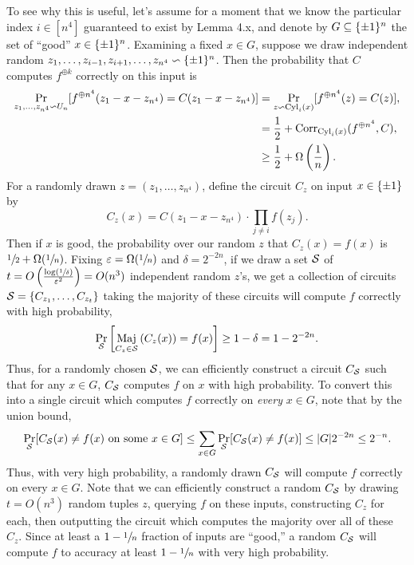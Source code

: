 \documentclass[11pt]{article}
\begin{document}
To see why this is useful, let's assume for a moment that we know the particular index $i \in [n^4]$ guaranteed to exist by Lemma 4.x, and denote by $G \subseteq \{\pm 1\}^n$ the set of ``good'' $x \in \{\pm 1\}^n$. Examining a fixed $x \in G$, suppose we draw independent random $z_1, \ldots, z_{i - 1}, z_{i + 1}, \ldots, z_{n^4} \backsim \{\pm 1\}^n$. Then the probability that $C$ computes $f^{\oplus k}$ correctly on this input is
\begin{align*}
    \Pr_{z_1, \ldots, z_{n^4} \backsim U_n}[f^{\oplus n^4}(z_1 - x - z_{n^4}) = C(z_1 - x - z_{n^4})] & = \Pr_{z \backsim \textup{Cyl}_i(x)}[f^{\oplus n^4}(z) = C(z)], \\ & = \frac{1}{2} + \mathrm{Corr}_{\textup{Cyl}_i(x)}(f^{\oplus n^4}, C), \\ & \geq \frac{1}{2} + \Omega\left(\frac{1}{n}\right).
\end{align*}
For a randomly drawn $z = (z_1, \ldots, z_{n^4})$, define the circuit $C_z$ on input $x \in \{\pm 1\}$ by 
\begin{equation*}
    C_z(x) = C(z_1 - x - z_{n^4}) \cdot \prod_{j \neq i} f(z_j).
\end{equation*}
Then if $x$ is good, the probability over our random $z$ that $C_z(x) = f(x)$ is $\sfrac{1}{2} + \Omega(\sfrac{1}{n})$. Fixing $\varepsilon = \Omega(\sfrac{1}{n})$ and $\delta = 2^{-2n}$, if we draw a set $\mathcal{S}$  of $t = O\left(\frac{\log\left(\sfrac{1}{\delta}\right)}{\varepsilon^2}\right) = O(n^3)$ independent random $z$'s, we get a collection of circuits $\mathcal{S} = \{C_{z_1}, \ldots, C_{z_t}\}$ taking the majority of these circuits will compute $f$ correctly with high probability,
\begin{equation*}
    \Pr_{\mathcal{S}}\left[\mathop{\textup{Maj}}_{C_z \in \mathcal{S}}\left(C_z(x)\right) = f(x)\right] \geq 1 - \delta = 1 - 2^{-2n}.
\end{equation*}
Thus, for a randomly chosen $\mathcal{S}$, we can efficiently construct a circuit $C_{\mathcal{S}}$ such that for any $x \in G$, $C_{\mathcal{S}}$ computes $f$ on $x$ with high probability. To convert this into a single circuit which computes $f$ correctly on \emph{every} $x \in G$, note that by the union bound, 
\begin{equation*}
    \Pr_{\mathcal{S}}[C_{\mathcal{S}}(x) \neq f(x) \text{ on some } x \in G] \leq \sum_{x \in G} \Pr_{\mathcal{S}}[C_{\mathcal{S}}(x) \neq f(x)] \leq |G|2^{-2n} \leq 2^{-n}.
\end{equation*}
Thus, with very high probability, a randomly drawn $C_{\mathcal{S}}$ will compute $f$ correctly on every $x \in G$. Note that we can efficiently construct a random $C_{\mathcal{S}}$ by drawing $t = O(n^3)$ random tuples $z$, querying $f$ on these inputs, constructing $C_z$ for each, then outputting the circuit which computes the majority over all of these $C_z$. Since at least a $1 - \sfrac{1}{n}$ fraction of inputs are ``good,'' a random $C_{\mathcal{S}}$ will compute $f$ to accuracy at least $1 - \sfrac{1}{n}$ with very high probability. 
\end{document}
